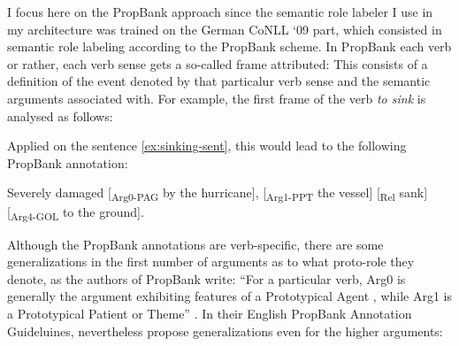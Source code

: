 I focus here on the PropBank approach since the semantic role labeler I use in my
architecture was trained on the German CoNLL `09 \citep{hajivc2009conll} part, which
consisted in semantic role labeling according to the PropBank scheme. In PropBank
each verb or rather, each verb sense gets a so-called frame attributed: This consists
of a definition of the event denoted by that particalur verb sense and the semantic
arguments associated with. For example, the first frame of the verb \emph{to
sink}
is analysed as follows:

\noindent{}

Applied on the sentence  \ref{ex:sinking-sent}, this would lead to the following PropBank annotation:

\begin{examples}
  \item Severely damaged [\textsubscript{Arg0-PAG} by the hurricane], [\textsubscript{Arg1-PPT} the vessel] [\textsubscript{Rel} sank] [\textsubscript{Arg4-GOL} to the ground].
\end{examples}


Although the PropBank annotations are verb-specific, there are some generalizations in the first
number of arguments as to what proto-role they denote, as the authors of PropBank write: ``For
a particular verb, Arg0 is generally the argument exhibiting features of a Prototypical Agent
\textelp{}, while Arg1 is a Prototypical Patient or Theme'' \citep[p.~75]{palmer2005proposition}.
In their English PropBank Annotation Guideluines, \cite{bonial2012english} nevertheless propose
generalizations even for the higher arguments:

